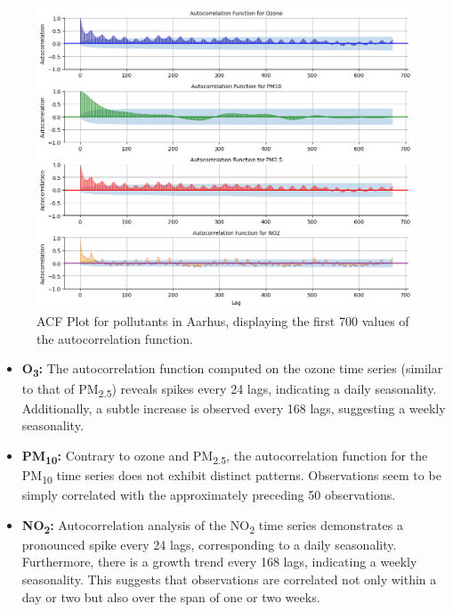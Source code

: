 \begin{figure}[h]
    \centering
    \includegraphics[width=1\linewidth]{images/acfplot_citypulse.png}
    \caption{ACF Plot for pollutants in Aarhus, displaying the first 700 values of the autocorrelation function.}
    \label{fig:acfplot_citypulse}
\end{figure}

\begin{itemize}[noitemsep]
    \item \textbf{O\textsubscript{3}:}
    The autocorrelation function computed on the ozone time series (similar to that of PM\textsubscript{2.5}) reveals spikes every 24 lags, indicating a daily seasonality. Additionally, a subtle increase is observed every 168 lags, suggesting a weekly seasonality.
    \item \textbf{PM\textsubscript{10}:}
    Contrary to ozone and PM\textsubscript{2.5}, the autocorrelation function for the PM\textsubscript{10} time series does not exhibit distinct patterns. Observations seem to be simply correlated with the approximately preceding 50 observations.
    \item \textbf{NO\textsubscript{2}:}
    Autocorrelation analysis of the NO\textsubscript{2} time series demonstrates a pronounced spike every 24 lags, corresponding to a daily seasonality. Furthermore, there is a growth trend every 168 lags, indicating a weekly seasonality. This suggests that observations are correlated not only within a day or two but also over the span of one or two weeks.

\end{itemize}






